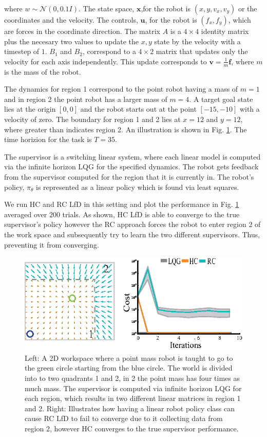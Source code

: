\documentclass[10pt, conference]{ieeeconf}      %
\newcommand{\bu}{\mathbf{u}}
\newcommand{\bx}{\mathbf{x}}
\begin{document}
where $w\sim \mathcal{N}(0,0.1 I)$. The state space, $\bx$,for the robot is $(x,y,v_x,v_y)$ or the coordinates and the velocity. The controls, $\bu$, for the robot is $(f_x,f_y)$, which are forces in the coordinate direction. The matrix $A$ is a $4\times4$ identity matrix plus the necesary two values to update the $x,y$ state by the velocity with a timestep of $1$. $B_1$ and $B_2$, correspond to a $4\times 2$ matrix that updates only the velocity for each axis independently. This update corresponds to $\mathbf{v} = \frac{1}{m} \mathbf{f}$, where $m$ is the mass of the robot. 


 The dynamics for region 1 correspond to the point robot having a mass of $m=1$ and in region 2 the point robot has a larger mass of $m=4$. A target goal state lies at the origin $[0,0]$ and the robot starts out at the point $[-15,-10]$ with a velocity of zero. The boundary for region 1 and 2 lies at $x=12$ and $y=12$, where greater than indicates region 2. An illustration is shown in Fig. \ref{fig:p_mass}. The time horizion for the task is $T=35$. 

The supervisor is a switching linear system, where each linear model is computed via the infinite horizon LQG for the specified dynamics. The robot gets feedback from the supervisor computed for the region that it is currently in.  The robot's policy, $\pi_{\theta}$ is represented as a linear policy which is found via least squares. 

We run HC and RC LfD in this setting and plot the performance in Fig. \ref{fig:p_mass} averaged over $200$ trials.  As shown, HC LfD is able to converge to the true supervisor's policy however the RC approach  forces the robot to enter region 2 of the work space and subsequently try to learn the two different supervisors. Thus, preventing it from converging. 

\begin{figure}
\centering
\includegraphics{f_figs/p_mass.eps}
\caption{
    \footnotesize
Left: A 2D workspace where a point mass robot is taught to go to the green circle starting from the blue circle. The world is divided into to two quadrants 1 and 2, in 2 the point mass has four times as much mass. The supervisor is computed via infinite horizon LQG for each region, which results in two different linear matrices in region 1 and 2. Right: Illustrates how having a linear robot policy class can cause RC LfD to fail  to converge due to it collecting data from region 2, however HC converges to the true supervisor performance. }
\vspace*{-1pt}
\label{fig:p_mass}
\end{figure}
\end{document}
